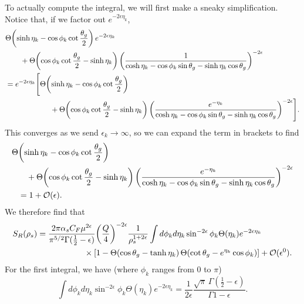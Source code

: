 \documentclass[../thesis.tex]{subfiles}
\providecommand{\cO}{\mathcal{O}}
\begin{document}
	To actually compute the integral, we will first make a sneaky simplification. Notice that, if we factor out $e^{-2\epsilon\eta_k}$,
	\begin{equation}
	\begin{aligned}
		&\Theta\qty(\sinh\eta_k - \cos\phi_k\cot\frac{\theta_g}{2})\,e^{-2\epsilon\eta_k} \\
			&\qquad+ \Theta\qty(\cos\phi_k\cot\frac{\theta_g}{2} - \sinh\eta_k)\, \qty(\frac{1}{\cosh\eta_k - \cos\phi_k\sin\theta_g - \sinh\eta_k\cos\theta_g})^{-2\epsilon} \\
		&= e^{-2\epsilon\eta_k} \Bigg[\Theta\qty(\sinh\eta_k - \cos\phi_k\cot\frac{\theta_g}{2}) \\
			&\qquad\qquad\qquad + \Theta\qty(\cos\phi_k\cot\frac{\theta_g}{2} - \sinh\eta_k)\, \qty(\frac{e^{-\eta_k}}{\cosh\eta_k - \cos\phi_k\sin\theta_g - \sinh\eta_k\cos\theta_g})^{-2\epsilon}\Bigg].
	\end{aligned}
	\end{equation}
	This converges as we send $\epsilon_k \to \infty$, so we can expand the term in brackets to find
	\begin{equation}
	\begin{aligned}
		\Theta&\qty(\sinh\eta_k - \cos\phi_k\cot\frac{\theta_g}{2}) \\
			&\quad + \Theta\qty(\cos\phi_k\cot\frac{\theta_g}{2} - \sinh\eta_k)\, \qty(\frac{e^{-\eta_k}}{\cosh\eta_k - \cos\phi_k\sin\theta_g - \sinh\eta_k\cos\theta_g})^{-2\epsilon} \\
			&= 1 + \cO(\epsilon).
	\end{aligned}
	\end{equation}
	We therefore find that
	\begin{equation}
	\begin{aligned}
		S_R(\rho_s) &= \frac{2\pi \alpha_s C_F \mu^{2\epsilon}}{\pi^{5/2} \Gamma(\frac{1}{2} - \epsilon)} \qty(\frac{Q}{4})^{-2\epsilon} \frac{1}{\rho_s^{1 + 2\epsilon}} \int d\phi_k d\eta_k \sin^{-2\epsilon}\phi_k \Theta(\eta_k) e^{-2\epsilon\eta_k} \\
			&\hspace{2cm}\times \qty[1 - \Theta(\cos\theta_g - \tanh\eta_k)\,\Theta\qty(\cot\theta_g - e^{\eta_k}\cos\phi_k)] + \cO(\epsilon^0).
	\end{aligned}
	\end{equation}
	For the first integral, we have (where $\phi_k$ ranges from $0$ to $\pi$)
	\begin{equation}
		\int d\phi_k d\eta_k \sin^{-2\epsilon} \phi_k \Theta(\eta_k) e^{-2\epsilon \eta_k} = \frac{1}{2\epsilon} \frac{\sqrt{\pi}\,\Gamma(\frac{1}{2} - \epsilon)}{\Gamma{1 - \epsilon}}.
	\end{equation}
\end{document}
